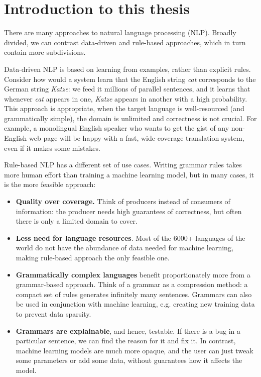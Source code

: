 \chapter{Introduction to this thesis}

There are many approaches to natural language processing (NLP).
Broadly divided, we can contrast data-driven and rule-based approaches,
which in turn contain more subdivisions.

Data-driven NLP is based on learning from examples, rather than
explicit rules. Consider how would a system learn that the English
string \emph{cat} corresponds to the German string \emph{Katze}: we
feed it millions of parallel sentences, and it learns that whenever
\emph{cat} appears in one, \emph{Katze} appears in another with a high
probability. This approach is appropriate, when the target language is
well-resourced (and grammatically simple), the domain is unlimited and
correctness is not crucial. For example, a monolingual English speaker
who wants to get the gist of any non-English web page will be happy
with a fast, wide-coverage translation system, even if it makes some
mistakes.

Rule-based NLP has a different set of use cases. Writing grammar rules
takes more human effort than training a machine learning model, but in
many cases, it is the more feasible approach:
\begin{itemize}
  \setlength\itemsep{0.0em} \item \textbf{Quality over coverage.}
  Think of producers instead of consumers of information: the producer
  needs high guarantees of correctness, but often there is only a
  limited domain to cover. %

\item \textbf{Less need for language resources}. Most of the 6000+
  languages of the world do not have the abundance of data needed for
  machine learning, making rule-based approach the only feasible one.

\item \textbf{Grammatically complex languages} benefit proportionately
  more from a grammar-based approach. Think of a grammar as a
  compression method: a compact set of rules generates infinitely many
  sentences. Grammars can also be used in conjunction with machine
  learning, e.g. creating new training data to prevent data sparsity.

\item \textbf{Grammars are explainable}, and hence, testable. If there
  is a bug in a particular sentence, we can find the reason for it and
  fix it. In contrast, machine learning models are much more opaque,
  and the user can just tweak some parameters or add some data, without guarantees how
  it affects the model.
\end{itemize}


